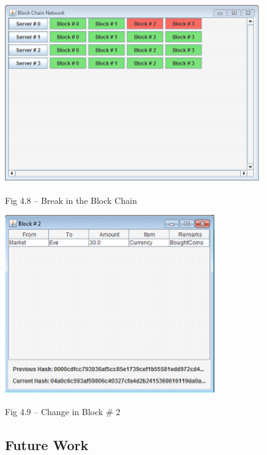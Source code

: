 \documentclass{article} %
\begin{document}
\noindent \begin{center}
\includegraphics*[bb=0 0 4.37in 3.02in, width=4.37in, height=3.02in, keepaspectratio=false]{image8.png}

\noindent Fig 4.8 -- Break in the Block Chain

\noindent \includegraphics*[bb=0 0 3.60in 3.05in, width=3.60in, height=3.05in, keepaspectratio=false]{image9.png}

\noindent Fig 4.9 -- Change in Block \# 2
\end{center}

\noindent \begin{flushleft}

\end{flushleft}

\noindent 
\subsection{Future Work}
\end{document}
